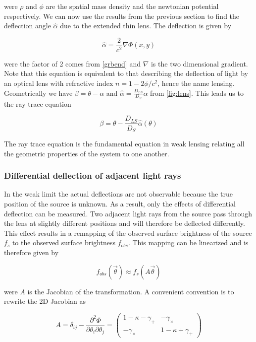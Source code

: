 were $\rho$ and $\phi$ are the spatial mass density and the newtonian potential respectively. We can now use the results from the previous section to find the deflection angle $\hat{\alpha}$ due to the extended thin lens. The deflection is given by

\begin{equation}
  \hat{\alpha} = \frac{2}{c^2} \nabla \Phi(x,y)
  \label{eq:deflectionthinlens}
\end{equation}

were the factor of 2 comes from \autoref{grbend} and $\nabla$ is the two dimensional gradient. Note that this equation is equivalent to that describing the deflection of light by an optical lens with refractive index $n=1-2\phi/c^2$, hence the name lensing. Geometrically we have $\beta = \theta - \alpha$ and $\hat{\alpha} = \frac{D_{LS}}{D_S}\alpha$ from \autoref{fig:lens}. This leads us to the ray trace equation

\begin{equation}
  \beta = \theta - \frac{D_{LS}}{D_S} \hat{\alpha}(\theta)
  \label{eq:raytrace}
\end{equation}

The ray trace equation is the fundamental equation in weak lensing relating all the geometric properties of the system to one another. 

\subsubsection{Differential deflection of adjacent light rays}
In the weak limit the actual deflections are not observable because the true position of the source is unknown. As a result, only the effects of differential deflection can be measured. Two adjacent light rays from the source pass through the lens at slightly different positions and will therefore be deflected differently. This effect results in a remapping of the observed surface brightness of the source $f_s$ to the observed surface brightness $f_{obs}$. This mapping can be linearized and is therefore given by 

\begin{equation}
  f_{obs}(\vec{\theta}) \approx f_s(A\vec{\theta})
  \label{eq:linearizedbright}
\end{equation}

were $A$ is the Jacobian of the transformation. A convenient convention is to rewrite the 2D Jacobian as 

\begin{equation}
  A = \delta_{ij} - \frac{\partial^2 \Phi}{\partial \theta_i \partial \theta_j} =  \begin{pmatrix}
    1-\kappa-\gamma_+ & -\gamma_\times \\
    -\gamma_\times & 1-\kappa+\gamma_+
    \end{pmatrix}
  \label{eq:Ajacobian}
\end{equation}

